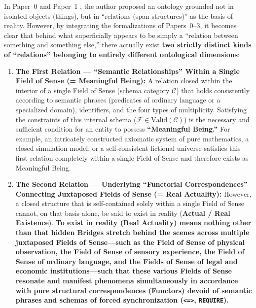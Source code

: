\documentclass[11pt,a4paper]{article}
\theoremstyle{definition}
\theoremstyle{plain}
\theoremstyle{remark}
\newcommand{\Valid}{\mathrm{Valid}}
\begin{document}
In Paper~0 \cite{ota2026paper0} and Paper~1 \cite{ota2026paper1}, the author proposed an ontology grounded not in isolated objects (things), but in ``relations (span structures)'' as the basis of reality. However, by integrating the formalizations of Papers~0--3, it becomes clear that behind what superficially appears to be simply a ``relation between something and something else,'' there actually exist \textbf{two strictly distinct kinds of ``relations'' belonging to entirely different ontological dimensions}:

\begin{enumerate}
    \item \textbf{The First Relation --- ``Semantic Relationships'' Within a Single Field of Sense (= Meaningful Being):}
    A relation closed within the interior of a single Field of Sense (schema category $\mathcal{C}$) that holds consistently according to semantic phrases (predicates of ordinary language or a specialized domain), identifiers, and the four types of multiplicity. Satisfying the constraints of this internal schema ($\mathcal{F} \in \Valid(\mathcal{C})$) is the necessary and sufficient condition for an entity to possess \textbf{``Meaningful Being.''} For example, an intricately constructed axiomatic system of pure mathematics, a closed simulation model, or a self-consistent fictional universe satisfies this first relation completely within a single Field of Sense and therefore exists as Meaningful Being.
    \item \textbf{The Second Relation --- Underlying ``Functorial Correspondences'' Connecting Juxtaposed Fields of Sense (= Real Actuality):}
    However, a closed structure that is self-contained solely within a single Field of Sense cannot, on that basis alone, be said to exist in reality (\textbf{Actual / Real Existence}). \textbf{To exist in reality (Real Actuality) means nothing other than that hidden Bridges stretch behind the scenes across multiple juxtaposed Fields of Sense---such as the Field of Sense of physical observation, the Field of Sense of sensory experience, the Field of Sense of ordinary language, and the Fields of Sense of legal and economic institutions---such that these various Fields of Sense resonate and manifest phenomena simultaneously in accordance with pure structural correspondences (Functors) devoid of semantic phrases and schemas of forced synchronization (\texttt{<=>}, \texttt{REQUIRE}).}
\end{enumerate}
\end{document}
